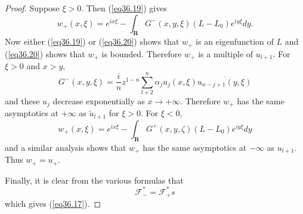 \documentclass{surv-l}
\theoremstyle{plain}
\theoremstyle{definition}
\numberwithin{equation}{chapter}
\begin{document}
\begin{proof}
Suppose $\xi>0$. Then (\ref{eq36.19}) gives
\begin{equation}\label{eq36.20}
w_{+}(x,\xi)=e^{ix\xi}-\int_{\mathbf{R}}G^{-}(x, y, \xi)(L-L_{0})e^{iy\xi}dy.
\end{equation}
Now either (\ref{eq36.19}) or (\ref{eq36.20}) shows that $w_{+}$ is an eigenfunction of $L$ and (\ref{eq36.20}) shows that $w_{+}$ is bounded. Therefore $w_{+}$ is a multiple of $u_{l+1}$. For $\xi>0$ and $x>y$,
\begin{equation*}
G^{-}(x, y,\xi)=\frac{i}{n}z^{1-n}\sum_{l+2}^{n}\alpha_{j}u_{j}(x, \xi)\overline{u_{n-j+1}(y,\xi)}
\end{equation*}
and these $u_{j}$ decrease exponentially as $x\rightarrow +\infty$. Therefore $w_{+}$ has the same asymptotics at $+\infty$ as $\tilde{u}_{l+1}$ for $\xi>0$. For $\xi<0$,
\begin{equation*}
w_{+}(x, \xi)=e^{ix\xi}-\int_{\mathbf{R}}G^{+}(x, y,\zeta)(L-L_{0})e^{iy\xi}dy
\end{equation*}
and a similar analysis shows that $w_{+}$ has the same asymptotics at $-\infty$ as $u_{l+1}$. Thus $w_{+}=u_{+}$.

Finally, it is clear from the various formulas that
\begin{equation*}
\mathscr{F}_{-}^{*}=\mathscr{F}_{+}^{*}s
\end{equation*}
which gives (\ref{eq36.17}).
\end{proof}
\end{document}
